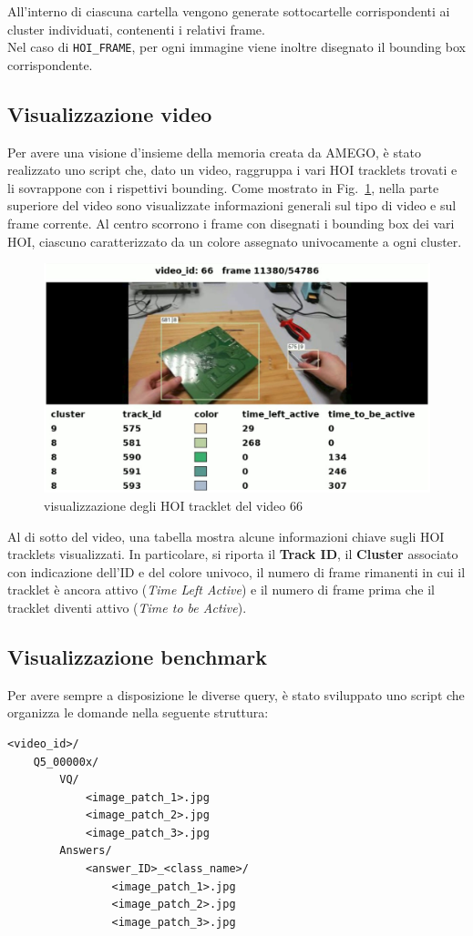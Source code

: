 All'interno di ciascuna cartella vengono generate sottocartelle corrispondenti ai cluster individuati, contenenti i relativi frame.\\
Nel caso di \texttt{HOI\_FRAME}, per ogni immagine viene inoltre disegnato il bounding box corrispondente.

\subsection*{Visualizzazione video}

Per avere una visione d'insieme della memoria creata da AMEGO, è stato realizzato uno script che, dato un video, raggruppa i vari HOI tracklets trovati e li sovrappone con i rispettivi bounding.
Come mostrato in Fig.~\ref{fig:amego_video}, nella parte superiore del video sono visualizzate informazioni generali sul tipo di video e sul frame corrente. Al centro scorrono i frame con disegnati i bounding box dei vari HOI, ciascuno caratterizzato da un colore assegnato univocamente a ogni cluster.

\begin{figure}[ht]
    \centering
    \includegraphics[width=0.7\linewidth]{Images/amego_video.jpg}
    \caption{visualizzazione degli HOI tracklet del video 66 }
    \label{fig:amego_video}
\end{figure}

Al di sotto del video, una tabella mostra alcune informazioni chiave sugli HOI tracklets visualizzati. In particolare, si riporta il \textbf{Track ID}, il \textbf{Cluster} associato con indicazione dell'ID e del colore univoco, il numero di frame rimanenti in cui il tracklet è ancora attivo (\textit{Time Left Active}) e il numero di frame prima che il tracklet diventi attivo (\textit{Time to be Active}).

\subsection*{Visualizzazione benchmark}
Per avere sempre a disposizione le diverse query, è stato sviluppato uno script che organizza le domande nella seguente struttura:

\begin{verbatim}
<video_id>/
    Q5_00000x/
        VQ/
            <image_patch_1>.jpg
            <image_patch_2>.jpg
            <image_patch_3>.jpg
        Answers/
            <answer_ID>_<class_name>/
                <image_patch_1>.jpg
                <image_patch_2>.jpg
                <image_patch_3>.jpg
\end{verbatim}
